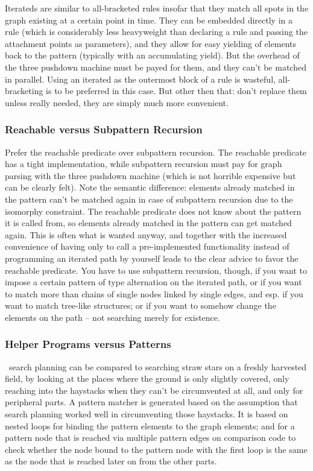 Iterateds are similar to all-bracketed rules insofar that they match all spots in the graph existing at a certain point in time.
They can be embedded directly in a rule (which is considerably less heavyweight than declaring a rule and passing the attachment points as parameters), and they allow for easy yielding of elements back to the pattern (typically with an accumulating yield).
But the overhead of the three pushdown machine must be payed for them, and they can't be matched in parallel.
Using an iterated as the outermost block of a rule is wasteful, all-bracketing is to be preferred in this case.
But other then that: don't replace them unless really needed, they are simply much more convenient.

\subsubsection*{Reachable versus Subpattern Recursion}
Prefer the reachable predicate over subpattern recursion.
The reachable predicate has a tight implementation, while subpattern recursion must pay for graph parsing with the three pushdown machine (which is not horrible expensive but can be clearly felt).
Note the semantic difference: elements already matched in the pattern can't be matched again in case of subpattern recursion due to the isomorphy constraint. 
The reachable predicate does not know about the pattern it is called from, so elements already matched in the pattern can get matched again.
This is often what is wanted anyway, and together with the increased convenience of having only to call a pre-implemented functionality instead of programming an iterated path by yourself leads to the clear advice to favor the reachable predicate.
You have to use subpattern recursion, though, if you want to impose a certain pattern of type alternation on the iterated path, 
or if you want to match more than chains of single nodes linked by single edges, and esp. if you want to match tree-like structures;
or if you want to somehow change the elements on the path -- not searching merely for existence.

\subsubsection*{Helper Programs versus Patterns}
\GrG\ search planning can be compared to searching straw stars on a freshly harvested field,
by looking at the places where the ground is only slightly covered, only reaching into the haystacks when
they can't be circumvented at all, and only for peripheral parts.
A pattern matcher is generated based on the assumption that search planning worked well in circumventing those haystacks. 
It is based on nested loops for binding the pattern elements to the graph elements;
and for a pattern node that is reached via multiple pattern edges on
comparison code to check whether the node bound to the pattern node with the first loop
is the same as the node that is reached later on from the other parts. 

